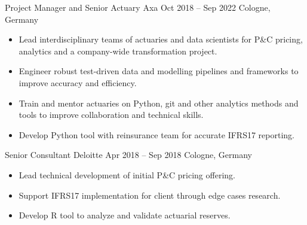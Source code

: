 \documentclass[a4paper,]{fortysecondscv}
\begin{document}
\begin{cvtable}
    \vspace{\topsep}
    \cvitemoneblock
    {Project Manager and Senior Actuary}
    {Axa}
    {Oct 2018 -- Sep 2022}
    {Cologne, Germany}
    {
        \begin{itemize}[nosep, leftmargin=12pt , label={-}] %
            \item Lead interdisciplinary teams of actuaries and data scientists for P\&C pricing, analytics and a company-wide transformation project.
            \item Engineer robust test-driven data and modelling pipelines and frameworks to improve accuracy and efficiency.
            \item Train and mentor actuaries on Python, git and other analytics methods and tools to improve collaboration and technical skills.
            \item Develop Python tool with reinsurance team for accurate IFRS17 reporting.
        \end{itemize}
    }
    \vspace{\topsep}
    \cvitemoneblock
    {Senior Consultant}
    {Deloitte}
    {Apr 2018 -- Sep 2018}
    {Cologne, Germany}
    {
        \begin{itemize}[nosep, leftmargin=12pt , label={-}] %
            \item Lead technical development of initial P\&C pricing offering.
            \item Support IFRS17 implementation for client through edge cases research.
            \item Develop R tool to analyze and validate actuarial reserves.

\end{itemize}}
\end{cvtable}
\end{document}
